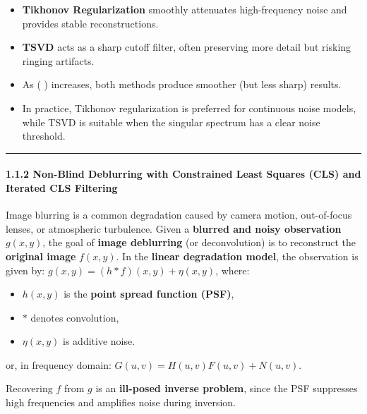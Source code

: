 \documentclass[11pt]{article}
\providecommand{\tightlist}{%
      \setlength{\itemsep}{0pt}\setlength{\parskip}{0pt}}
\begin{document}
\begin{itemize}
\tightlist
\item
  \textbf{Tikhonov Regularization} smoothly attenuates high-frequency
  noise and provides stable reconstructions.
\item
  \textbf{TSVD} acts as a sharp cutoff filter, often preserving more
  detail but risking ringing artifacts.
\item
  As ( \lambda ) increases, both methods produce smoother (but less
  sharp) results.
\item
  In practice, Tikhonov regularization is preferred for continuous noise
  models, while TSVD is suitable when the singular spectrum has a clear
  noise threshold.
\end{itemize}

\begin{center}\rule{0.5\linewidth}{0.5pt}\end{center}

\hypertarget{non-blind-deblurring-with-constrained-least-squares-cls-and-iterated-cls-filtering}{%
\paragraph{\texorpdfstring{\textbf{1.1.2 Non-Blind Deblurring with
Constrained Least Squares (CLS) and Iterated CLS
Filtering}}{1.1.2 Non-Blind Deblurring with Constrained Least Squares (CLS) and Iterated CLS Filtering}}\label{non-blind-deblurring-with-constrained-least-squares-cls-and-iterated-cls-filtering}}

Image blurring is a common degradation caused by camera motion,
out-of-focus lenses, or atmospheric turbulence. Given a \textbf{blurred
and noisy observation} \(g(x,y)\), the goal of \textbf{image deblurring}
(or deconvolution) is to reconstruct the \textbf{original image}
\(f(x,y)\). In the \textbf{linear degradation model}, the observation is
given by: \(g(x,y) = (h * f)(x,y) + \eta(x,y)\), where:

\begin{itemize}
\tightlist
\item
  \(h(x,y)\) is the \textbf{point spread function (PSF)},
\item
  \(*\) denotes convolution,
\item
  \(\eta(x,y)\) is additive noise.
\end{itemize}

or, in frequency domain: \(G(u,v) = H(u,v)F(u,v) + N(u,v)\).

Recovering \(f\) from \(g\) is an \textbf{ill-posed inverse problem},
since the PSF suppresses high frequencies and amplifies noise during
inversion.
\end{document}
